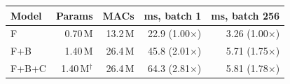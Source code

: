 \begin{tabular}{lrrrr}
\toprule
Model & Params & MACs & ms, batch 1 & ms, batch 256 \\
\midrule
F & 0.70\,M & 13.2\,M & 22.9 (1.00$\times$) & 3.26 (1.00$\times$) \\
F+B & 1.40\,M & 26.4\,M & 45.8 (2.01$\times$) & 5.71 (1.75$\times$) \\
F+B+C & 1.40\,M$^\dagger$ & 26.4\,M & 64.3 (2.81$\times$) & 5.81 (1.78$\times$) \\
\bottomrule
\end{tabular}
